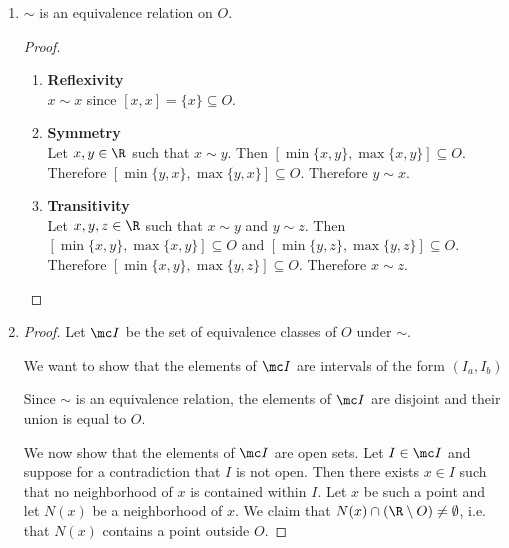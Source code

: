 \begin{enumerate}
\item
  \begin{claim*}
    $\sim$ is an equivalence relation on $O$.
  \end{claim*}
  \begin{proof}
    \begin{enumerate}
    \item {\bf Reflexivity}\\
      $x \sim x$ since $[x, x] = \{x\} \subseteq O$.

    \item {\bf Symmetry}\\
      Let $x, y \in \R$ such that $x \sim y$. Then $[\min\{x, y\}, \max\{x, y\}] \subseteq O$.
      Therefore $[\min\{y, x\}, \max\{y, x\}] \subseteq O$. Therefore $y \sim x$.

    \item {\bf Transitivity}\\
      Let $x, y, z \in \R$ such that $x \sim y$ and $y \sim z$. Then $[\min\{x, y\}, \max\{x, y\}] \subseteq O$
      and $[\min\{y, z\}, \max\{y, z\}] \subseteq O$. Therefore $[\min\{x, y\}, \max\{y, z\}] \subseteq O$.
      Therefore $x \sim z$.
    \end{enumerate}
  \end{proof}

\item
  \begin{proof}
    Let $\mc I$ be the set of equivalence classes of $O$ under $\sim$.

     We want to show that the elements of $\mc I$ are intervals of the form $(I_a, I_b)$

    Since $\sim$ is an equivalence relation, the elements of $\mc I$ are disjoint and their union is equal
    to $O$.

    We now show that the elements of $\mc I$ are open sets. Let $I \in \mc I$ and suppose for a contradiction
    that $I$ is not open. Then there exists $x \in I$ such that no neighborhood of $x$ is contained within $I$.
    Let $x$ be such a point and let $N(x)$ be a neighborhood of $x$. We claim
    that $N(x) \cap (\R \setminus O) \neq \emptyset$, i.e. that $N(x)$ contains a point outside $O$.




\end{proof}
\end{enumerate}
